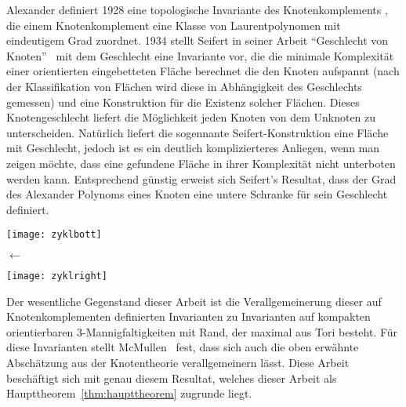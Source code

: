 \begin{minipage}[t][\textheight][t]{0.76\textwidth}
	Alexander definiert 1928 eine topologische Invariante des Knotenkomplements \cite{Alexander.1928}, die einem Knotenkomplement eine Klasse von Laurentpolynomen mit eindeutigem Grad zuordnet. 1934 stellt Seifert in seiner Arbeit "`Geschlecht von Knoten"'~\cite{Seifert.1934} mit dem Geschlecht eine Invariante vor, die die minimale Komplexität einer orientierten eingebetteten Fläche berechnet die den Knoten aufspannt (nach der Klassifikation von Flächen wird diese in Abhängigkeit des Geschlechts gemessen) und eine Konstruktion für die Existenz solcher Flächen. Dieses Knotengeschlecht liefert die Möglichkeit jeden Knoten von dem Unknoten zu unterscheiden. Natürlich liefert die sogennante Seifert-Konstruktion eine Fläche mit Geschlecht, jedoch ist es ein deutlich komplizierteres Anliegen, wenn man zeigen möchte, dass eine gefundene Fläche in ihrer Komplexität nicht unterboten werden kann. Entsprechend günstig erweist sich Seifert's Resultat, dass der Grad des Alexander Polynoms eines Knoten eine untere Schranke für sein Geschlecht definiert. 


	\vfill
	\begin{minipage}[t]{0.7\textwidth}
		\texttt{[image: zyklbott]} 
	\end{minipage}
	\begin{minipage}[t]{0.2\textwidth}
	\vspace{-1cm}
	\huge$\longleftarrow$
	\vfill

	\end{minipage}
	\vspace{.63cm}
		 \label{fig:zykl}
	\end{minipage}
	\hfill
	\begin{minipage}[t]{0.2\textwidth}
	\vfill \begin{flushright}
		\texttt{[image: zyklright]} 
	\end{flushright}
	\end{minipage}
    
	Der wesentliche Gegenstand dieser Arbeit ist die Verallgemeinerung dieser auf Knotenkomplementen definierten Invarianten zu Invarianten auf kompakten orientierbaren 3-Mannigfaltigkeiten mit Rand, der maximal aus Tori besteht. Für diese Invarianten stellt McMullen~\cite{MCMULLEN.2002} fest, dass sich auch die oben erwähnte Abschätzung aus der Knotentheorie verallgemeinern lässt. Diese Arbeit beschäftigt sich mit genau diesem Resultat, welches dieser Arbeit als Haupttheorem~\ref{thm:haupttheorem} zugrunde liegt.

